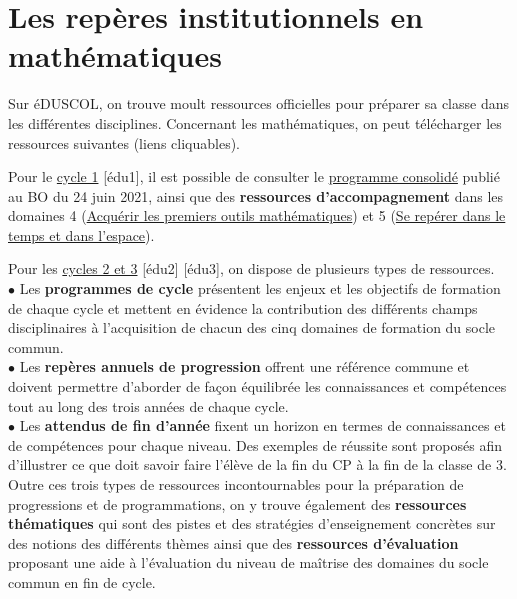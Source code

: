 \bigskip


\section{Les repères institutionnels en mathématiques} 

\smallskip
Sur éDUSCOL, on trouve moult ressources officielles pour préparer sa classe dans les différentes disciplines. Concernant les mathématiques, on peut télécharger les ressources suivantes (liens cliquables). \medskip

Pour le \uline{cycle 1} [édu1], il est possible de consulter le \href{https://eduscol.education.fr/document/20062/download}{\blue programme consolidé} publié au BO du 24 juin 2021, ainsi que des {\bf ressources d'accompagnement} dans les domaines 4 (\href{https://eduscol.education.fr/2819/acquerir-les-premiers-outils-mathematiques}{\blue Acquérir les premiers outils mathématiques}) et 5 (\href{https://eduscol.education.fr/2822/se-reperer-dans-le-temps-et-l-espace}{\blue Se repérer dans le temps et dans l'espace}). \medskip

Pour les \uline{cycles 2 et 3} [édu2] [édu3], on dispose de plusieurs types de ressources. \\
$\bullet$ Les {\bf programmes de cycle} présentent les enjeux et les objectifs de formation de chaque cycle et mettent en évidence la contribution des différents champs disciplinaires à l'acquisition de chacun des cinq domaines de formation du socle commun. \\
$\bullet$ Les {\bf repères annuels de progression} offrent une référence commune et doivent permettre d'aborder de façon équilibrée les connaissances et compétences tout au long des trois années de chaque cycle. \\
$\bullet$ Les {\bf attendus de fin d'année} fixent un horizon en termes de connaissances et de compétences pour chaque niveau. Des exemples de réussite sont proposés afin d'illustrer ce que doit savoir faire l'élève de la fin du CP à la fin de la classe de 3. \\
Outre ces trois types de ressources incontournables pour la préparation de progressions et de programmations, on y trouve également des {\bf ressources thématiques} qui sont des pistes et des stratégies d'enseignement concrètes sur des notions des différents thèmes ainsi que des {\bf ressources d'évaluation} proposant une aide à l'évaluation du niveau de maîtrise des domaines du socle commun en fin de cycle. \medskip

